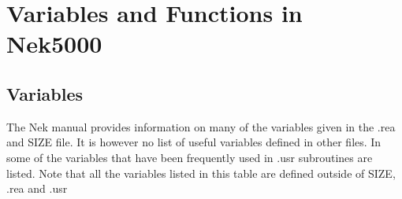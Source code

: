 
\chapter{Variables and Functions in Nek5000} %

\label{AppendixB} %


\section{Variables}

The Nek manual provides information on many of the variables given in the .rea and SIZE
file. It is however no list of useful variables defined in other files. 
In~ some of the variables that have been frequently used in .usr
subroutines are listed. Note that all the variables listed in this table are defined outside of SIZE, .rea and .usr 


